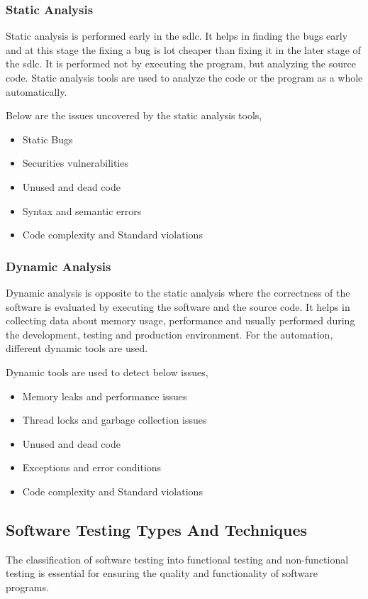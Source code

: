 \subsubsection{Static Analysis}
Static analysis is performed early in the \acrshort{sdlc}. It helps in finding the bugs early and at this
stage the fixing a bug is lot cheaper than fixing it in the later stage of the \acrshort{sdlc}.
It is performed not by executing the program, but analyzing the source code.
Static analysis tools are used to analyze the code or the program as a whole automatically.

Below are the issues uncovered by the static analysis tools,
\begin{itemize}
        \item Static Bugs
        \item Securities vulnerabilities
        \item Unused and dead code
        \item Syntax and semantic errors
        \item Code complexity and Standard violations
\end{itemize}

\subsubsection{Dynamic Analysis}
Dynamic analysis is opposite to the static analysis where the correctness of the software is evaluated
by executing the software and the source code. It helps in collecting data about memory usage, performance
and usually performed during the development, testing and production environment. For the automation,
different dynamic tools are used.

Dynamic tools are used to detect below issues,

\begin{itemize}
        \item Memory leaks and performance issues
        \item Thread locks and garbage collection issues
        \item Unused and dead code
        \item Exceptions and error conditions
        \item Code complexity and Standard violations
\end{itemize}

\subsection{Software Testing Types And Techniques}
The classification of software testing into functional testing and non-functional
testing is essential for ensuring the quality and functionality of software
programs.

